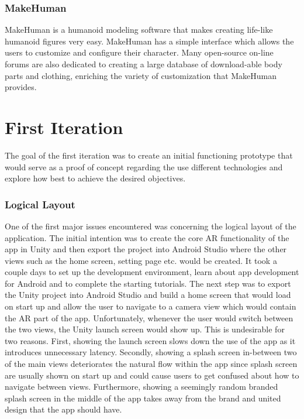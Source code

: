\documentclass{l4proj}
\begin{document}
\subsubsection{MakeHuman}
MakeHuman is a humanoid modeling software that makes creating life-like humanoid figures very easy. MakeHuman has a simple interface which allows the users to customize and configure their character. Many open-source on-line forums are also dedicated to creating a large database of download-able body parts and clothing, enriching the variety of customization that MakeHuman provides.

\section{First Iteration}
The goal of the first iteration was to create an initial functioning prototype that would serve as a proof of concept regarding the use different technologies and explore how best to achieve the desired objectives. 

\subsubsection{Logical Layout}
One of the first major issues encountered was concerning the logical layout of the application. The initial intention was to create the core AR functionality of the app in Unity and then export the project into Android Studio where the other views such as the home screen, setting page etc. would be created. It took a couple days to set up the development environment, learn about app development for Android and to complete the starting tutorials. The next step was to export the Unity project into Android Studio and build a home screen that would load on start up and allow the user to navigate to a camera view which would contain the AR part of the app. Unfortunately, whenever the user would switch between the two views, the Unity launch screen would show up. This is undesirable for two reasons. First, showing the launch screen slows down the use of the app as it introduces unnecessary latency. Secondly, showing a splash screen in-between two of the main views deteriorates the natural flow within the app since splash screen are usually shown on start up and could cause users to get confused about how to navigate between views. Furthermore, showing a seemingly random branded splash screen in the middle of the app takes away from the brand and united design that the app should have. 
\end{document}
